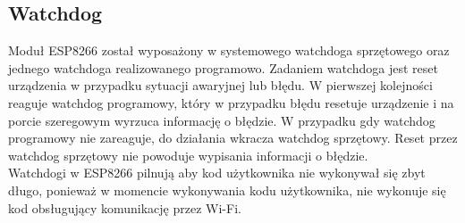 \subsection{Watchdog}
\label{watchdog}

Moduł ESP8266 został wyposażony w systemowego watchdoga sprzętowego oraz
jednego watchdoga realizowanego programowo. Zadaniem watchdoga jest reset urządzenia 
w przypadku sytuacji awaryjnej lub błędu. W pierwszej kolejności reaguje watchdog
programowy, który w przypadku błędu resetuje urządzenie i na porcie szeregowym 
wyrzuca informację o błędzie. W przypadku gdy watchdog programowy nie zareaguje, 
do działania wkracza watchdog sprzętowy. Reset przez watchdog sprzętowy nie powoduje
wypisania informacji o błędzie.\\

Watchdogi w ESP8266 pilnują aby kod użytkownika nie wykonywał się zbyt długo, ponieważ
w momencie wykonywania kodu użytkownika, nie wykonuje się kod obsługujący komunikację 
przez Wi-Fi.
